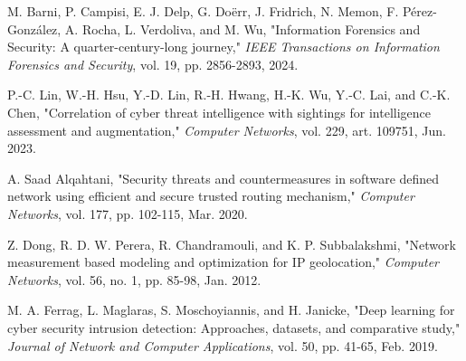 \begin{thebibliography}{9}
M. Barni, P. Campisi, E. J. Delp, G. Doërr, J. Fridrich, N. Memon, F. Pérez-González, A. Rocha, L. Verdoliva, and M. Wu, "Information Forensics and Security: A quarter-century-long journey," \textit{IEEE Transactions on Information Forensics and Security}, vol. 19, pp. 2856-2893, 2024.

P.-C. Lin, W.-H. Hsu, Y.-D. Lin, R.-H. Hwang, H.-K. Wu, Y.-C. Lai, and C.-K. Chen, "Correlation of cyber threat intelligence with sightings for intelligence assessment and augmentation," \textit{Computer Networks}, vol. 229, art. 109751, Jun. 2023.

A. Saad Alqahtani, "Security threats and countermeasures in software defined network using efficient and secure trusted routing mechanism," \textit{Computer Networks}, vol. 177, pp. 102-115, Mar. 2020.

Z. Dong, R. D. W. Perera, R. Chandramouli, and K. P. Subbalakshmi, "Network measurement based modeling and optimization for IP geolocation," \textit{Computer Networks}, vol. 56, no. 1, pp. 85-98, Jan. 2012.

M. A. Ferrag, L. Maglaras, S. Moschoyiannis, and H. Janicke, "Deep learning for cyber security intrusion detection: Approaches, datasets, and comparative study," \textit{Journal of Network and Computer Applications}, vol. 50, pp. 41-65, Feb. 2019.
\end{thebibliography}
